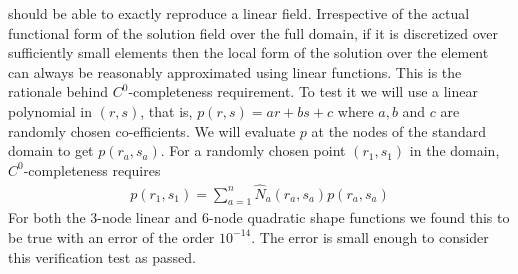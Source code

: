 \documentclass[../main.tex]{subfiles}
\begin{document}
\begin{itemize}
  should be able to exactly reproduce a linear field. Irrespective of
  the actual functional form of the solution field over the full
  domain, if it is discretized over sufficiently small elements then
  the local form of the solution over the element can always be
  reasonably approximated using linear functions. This is the
  rationale behind $C^0$-completeness requirement. To test it we will
  use a linear polynomial in $(r,s)$, that is, $p(r,s) = ar+bs+c$ where
  $a,b$ and $c$ are randomly chosen co-efficients. We will evaluate
  $p$ at the nodes of the standard domain to get $p(r_a,s_a)$. For a
  randomly chosen point $(r_1,s_1)$ in the domain, $C^0$-completeness
  requires
  \begin{align*}
    p(r_1,s_1) = \sum_{a=1}^n\hat{N}_a(r_a,s_a)p(r_a,s_a)
  \end{align*}
  For both the 3-node linear and 6-node quadratic shape functions we
  found this to be true with an error of the order $10^{-14}$. The
  error is small enough to consider this verification test as passed.
\end{itemize}
\end{document}
